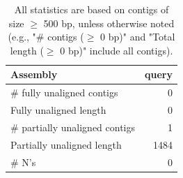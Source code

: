 \documentclass[12pt,a4paper]{article}
\begin{document}
\begin{table}[ht]
\begin{center}
\caption{All statistics are based on contigs of size $\geq$ 500 bp, unless otherwise noted (e.g., "\# contigs ($\geq$ 0 bp)" and "Total length ($\geq$ 0 bp)" include all contigs).}
\begin{tabular}{|l*{1}{|r}|}
\hline
Assembly & query \\ \hline
\# fully unaligned contigs & 0 \\ \hline
Fully unaligned length & 0 \\ \hline
\# partially unaligned contigs & 1 \\ \hline
Partially unaligned length & 1484 \\ \hline
\# N's & 0 \\ \hline
\end{tabular}
\end{center}
\end{table}
\end{document}
